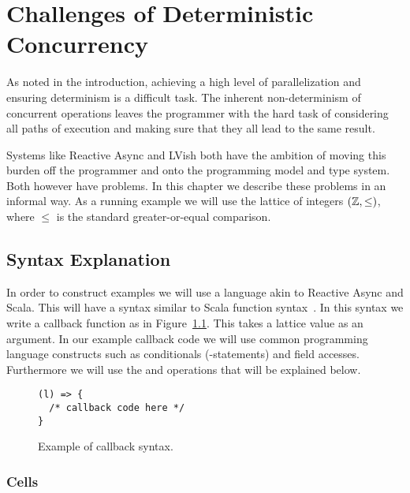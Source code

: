 \chapter{Challenges of Deterministic Concurrency}
\label{cha:challenges}

As noted in the introduction, achieving a high level of parallelization and
ensuring determinism is a difficult task. The inherent non-determinism of
concurrent operations leaves the programmer with the hard task of considering
all paths of execution and making sure that they all lead to the same result.

Systems like Reactive Async and LVish both have the ambition of moving this
burden off the programmer and onto the programming model and type system. Both
however have problems. In this chapter we describe these problems in an informal
way. As a running example we will use the lattice of integers $(\mathbb{Z},
\leq)$, where $\leq$ is the standard greater-or-equal comparison.


\section{Syntax Explanation}%
\label{sec:operations}

In order to construct examples we will use a language akin to Reactive Async and
Scala. This will have a syntax similar to Scala function
syntax~\parencite{scalabasics}. In this syntax we write a callback function as in
Figure~\ref{fig:callback_syntax}. This takes a lattice value  as
an argument. In our example callback code we will use common programming language
constructs such as conditionals (-statements) and field accesses.
Furthermore we will use the  and  operations that will be
explained below.

\begin{figure}
  \centering
  \begin{minipage}{0.763\textwidth}
    \begin{lstlisting}[]
(l) => {
  /* callback code here */
}
    \end{lstlisting}
  \end{minipage}
  \caption{Example of callback syntax.}
  \label{fig:callback_syntax}
\end{figure}

\subsection{Cells}%
\label{sub:cells}

